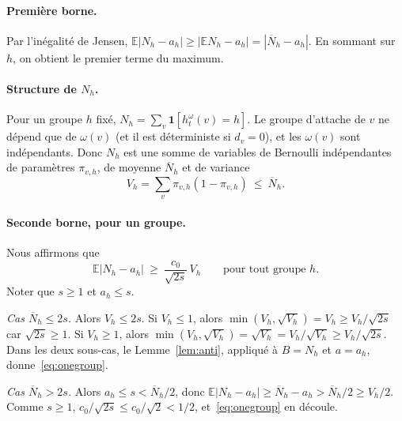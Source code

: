 \documentclass[11pt,a4paper]{article}
\theoremstyle{definition}
\theoremstyle{remark}
\newcommand{\E}{\mathbb{E}}
\newcommand{\Nbar}{\overline{N}}
\begin{document}
\paragraph{Première borne.} Par l'inégalité de Jensen,
$\E|N_h-a_h|\ge|\E N_h-a_h|=|\Nbar_h-a_h|$. En sommant sur $h$, on obtient le premier terme
du maximum.

\paragraph{Structure de $N_h$.} Pour un groupe $h$ fixé,
$N_h=\sum_v\mathbf 1[h^\omega_t(v)=h]$. Le groupe d'attache de $v$ ne dépend que de
$\omega(v)$ (et il est déterministe si $d_v=0$), et les $\omega(v)$ sont indépendants. Donc
$N_h$ est une somme de variables de Bernoulli indépendantes de paramètres $\pi_{v,h}$, de
moyenne $\Nbar_h$ et de variance
\[
V_h=\sum_v\pi_{v,h}(1-\pi_{v,h})\ \le\ \Nbar_h .
\]

\paragraph{Seconde borne, pour un groupe.} Nous affirmons que
\begin{equation}\label{eq:onegroup}
\E|N_h-a_h|\ \ge\ \frac{c_0}{\sqrt{2s}}\,V_h\qquad\text{pour tout groupe }h.
\end{equation}
Noter que $s\ge1$ et $a_h\le s$.

\emph{Cas $\Nbar_h\le2s$.} Alors $V_h\le2s$. Si $V_h\le1$, alors
$\min(V_h,\sqrt{V_h})=V_h\ge V_h/\sqrt{2s}$ car $\sqrt{2s}\ge1$. Si $V_h\ge1$, alors
$\min(V_h,\sqrt{V_h})=\sqrt{V_h}=V_h/\sqrt{V_h}\ge V_h/\sqrt{2s}$. Dans les deux sous-cas,
le Lemme~\ref{lem:anti}, appliqué à $B=N_h$ et $a=a_h$, donne~\eqref{eq:onegroup}.

\emph{Cas $\Nbar_h>2s$.} Alors $a_h\le s<\Nbar_h/2$, donc
$\E|N_h-a_h|\ge\Nbar_h-a_h>\Nbar_h/2\ge V_h/2$. Comme $s\ge1$,
$c_0/\sqrt{2s}\le c_0/\sqrt2<1/2$, et~\eqref{eq:onegroup} en découle.
\end{document}
